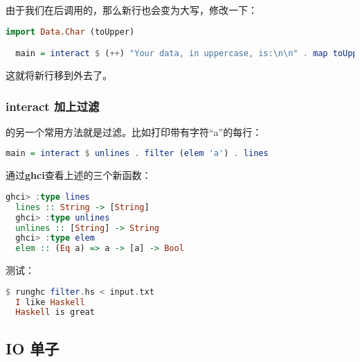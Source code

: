 \documentclass[./main.tex]{subfiles}
\begin{document}
由于我们在\acode{(++)}后调用的，那么新行也会变为大写，修改一下：

\begin{lstlisting}[language=Haskell]
  import Data.Char (toUpper)

  main = interact $ (++) "Your data, in uppercase, is:\n\n" . map toUpper
\end{lstlisting}

这就将新行移到外去了。

\subsubsection*{interact 加上过滤}

的另一个常用方法就是过滤。比如打印带有字符“a”的每行：

\begin{lstlisting}[language=Haskell]
  main = interact $ unlines . filter (elem 'a') . lines
\end{lstlisting}

通过\textbf{ghci}查看上述的三个新函数：

\begin{lstlisting}[language=Haskell]
  ghci> :type lines
  lines :: String -> [String]
  ghci> :type unlines
  unlines :: [String] -> String
  ghci> :type elem
  elem :: (Eq a) => a -> [a] -> Bool
\end{lstlisting}

测试：

\begin{lstlisting}[language=Haskell]
  $ runghc filter.hs < input.txt
  I like Haskell
  Haskell is great
\end{lstlisting}

\subsection*{IO 单子}


\begin{lstlisting}[language=Haskell]

\end{lstlisting}
\end{document}
